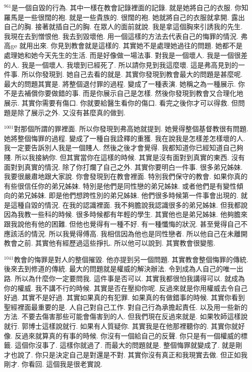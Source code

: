 \documentclass{book}
\begin{document}
$^{961}$是一個自毀的行為.
其中一樣在教會記錄裡面的記錄.
就是她將自己的衣服.
你知羅馬是一些很闊的袍.
就是一些貴族的.
很闊的袍.
她就將自己的衣服就拿開.
露出自己的胸.
接著就插自己的胸.
在眾人的面前就說.
我是拿這個胸來引誘我的先生.
我現在去到憎恨他.
我去到毀壞他.
用一個這樣的方法去代表自己的悔罪的情況.
弗高ge 就用出來.
你見到教會就是這樣的.
其實她不是處理她過往的問題.
她都不是處理她和她今天先生的生活.
而是好像做一場法事.
對我是一個壞人.
我是一個很差的人.
我是一個壞人.
我壞到已經死了.
所以請你見到我這麼壞.
這是弗高見到的一件事.
所以你發現到.
她自己去看的就是.
其實你發現到教會最大的問題是甚麼呢.
最大的問題其實是.
將整個退付罪的過程.
變成了一種表演.
她稱之為一種展示.
你不是去補償你要做錯的事.
而是你展示自己是怎樣.
然後你發現到教會又合理化地展示.
其實你需要有傷口.
你就要給醫生看你的傷口.
看完之後你才可以得救.
但問題是除了展示之外.
又沒有甚麼真的做到.

$^{1001}$對那個所謂的罪裡面.
所以你發現到弗高她就提到.
她覺得整個基督教很有問題.
她將整個悔罪的過程.
變成了一種自我詮釋的重獲.
我在說我是怎樣差怎樣壞的人.
我一定要告訴別人我是一個賤人.
然後之後才會覺得.
我都知道你已經知道自己夠賤.
所以我接納你.
但其實當你在這樣的時候.
其實是沒有面對到真實的東西.
沒有面對到真實的情況.
除了你打爛了自己之外.
其實你要明白一件事.
很多弟兄姊妹.
我要很嚴肅地跟大家說.
你會發現到在教會裡面.
特別我們保守的教會.
如果你真的有些很信任你的弟兄姊妹.
特別是他們是同性戀的弟兄姊妹.
或者他們是有變性傾向的弟兄姊妹.
即是他們想跨性別的弟兄姊妹.
他們很多時候第一件事會出現的.
就是這種自毀的情況.
在我的認識裡面.
我不夠膽說我認識很多的弟兄姊妹.
但我都說因為我教一些科的時候.
很多時候都有年輕的學生.
其實他也是弟兄姊妹.
他夠膽來跟我說他有他的困難.
但他也覺得有一種不好.
有一種懺悔的狀況.
甚至覺得自己不應該活的情況.
所以我覺得傅高.
我相信因為他也是同性戀者.
所以他自己在未離開教會之前.
其實他有經歷過這些掙扎.
所以他可以說到.
其實教會很變態.

$^{1041}$教會的悔罪是對人的整個摧毀.
他亦提到另一個問題.
其實教會整個悔罪的傳統.
後來去到修道的傳統.
最大的問題就是權威的解決辦法.
令到成為人自己的唯一出路.
所以為什麼你一定要問我.
這件事是否可以.
其實我都很怕我講得可以.
就成為你的權威.
我不講不行的時候.
其實是否在壓抑你呢.
反過來就是你用權威去令自己好過.
其實不是好過.
其實如果真的有犯罪.
如果真的有做錯事的時候.
其實你看到聖經裡面最重要的是.
人自己對自己工作.
對自己行為承擔起責任.
以及用一些新的方法.
不要去傷害那些可能會傷害到的人.
但我們現在反過來就是.
如果牧師這樣說就行.
郭博士這樣說就行.
如果有人質疑你.
其實我是在他那裡聽你的.
其實你就好像.
反過來就算真的有事的時候.
你沒有一個給自己的反聲.
你只是有一個權威的標籤.
這個你沒事了.
這樣你就過了.
而最大的問題就是.
整個悔罪就變成了.
就是剛才也說了.
你只是決定自己是對還是不對.
其實你沒有真正和我現實去做.
但正如我剛才.
你看回.
這個我是很老實說.
\end{document}
